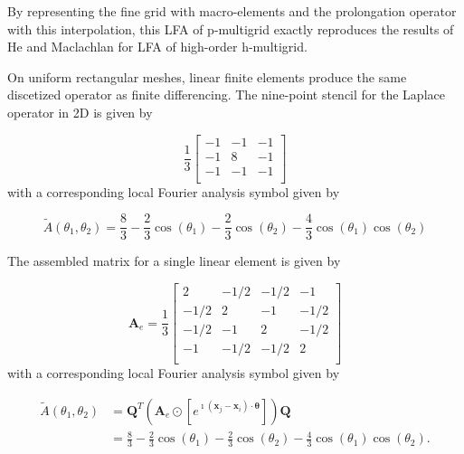 \documentclass[review]{siamart190516}
\begin{document}
By representing the fine grid with macro-elements and the prolongation operator with this interpolation, this LFA of p-multigrid exactly reproduces the results of He and Maclachlan \cite{he2020two} for LFA of high-order h-multigrid.

On uniform rectangular meshes, linear finite elements produce the same discetized operator as finite differencing.
The nine-point stencil for the Laplace operator in 2D is given by

\begin{equation}
\frac{1}{3}
\begin{bmatrix}
-1  &  -1  &  -1   \\
-1  &   8  &  -1   \\
-1  &  -1  &  -1  \\
\end{bmatrix}
\end{equation}
with a corresponding local Fourier analysis symbol given by

\begin{equation}
\tilde{A} \left( \theta_1, \theta_2 \right) = \frac{8}{3} - \frac{2}{3} \cos \left( \theta_1 \right) - \frac{2}{3} \cos \left( \theta_2 \right) - \frac{4}{3} \cos \left( \theta_1 \right) \cos \left( \theta_2 \right)
\end{equation}

The assembled matrix for a single linear element is given by

\begin{equation}
\mathbf{A}_e =
\frac{1}{3}
\begin{bmatrix}
 2    &  -1/2  &  -1/2  &  -1    \\
-1/2  &   2    &  -1    &  -1/2  \\
-1/2  &  -1    &   2    &  -1/2  \\
-1    &  -1/2  &  -1/2  &   2    \\
\end{bmatrix}
\end{equation}
with a corresponding local Fourier analysis symbol given by

\begin{equation}
\begin{split}
\tilde{A} \left( \theta_1, \theta_2 \right) & = \mathbf{Q}^T \left( \mathbf{A}_e \odot \left[ e^{\imath \left( \mathbf{x}_j - \mathbf{x}_i \right) \cdot \boldsymbol{\theta}} \right] \right) \mathbf{Q}\\ & = \frac{8}{3} - \frac{2}{3} \cos \left( \theta_1 \right) - \frac{2}{3} \cos \left( \theta_2 \right) - \frac{4}{3} \cos \left( \theta_1 \right) \cos \left( \theta_2 \right).
\end{split}
\end{equation}
\end{document}
